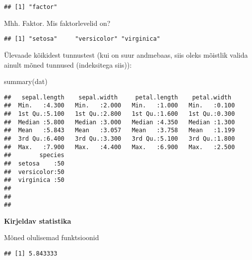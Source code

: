 \documentclass[
]{book}
\newenvironment{Shaded}{\begin{snugshade}}{\end{snugshade}}
\newcommand{\CommentTok}[1]{\textcolor[rgb]{0.56,0.35,0.01}{\textit{#1}}}
\newcommand{\FunctionTok}[1]{\textcolor[rgb]{0.00,0.00,0.00}{#1}}
\newcommand{\NormalTok}[1]{#1}
\newcommand{\SpecialCharTok}[1]{\textcolor[rgb]{0.00,0.00,0.00}{#1}}
\begin{document}
\begin{verbatim}
## [1] "factor"
\end{verbatim}

Mhh. Faktor. Mis faktorlevelid on?

\begin{Shaded}
\end{Shaded}

\begin{verbatim}
## [1] "setosa"     "versicolor" "virginica"
\end{verbatim}

Ülevaade kõikidest tunnustest (kui on suur andmebaas, siis oleks mõistlik valida ainult mõned tunnused (indeksitega siis)):

\begin{Shaded}
\begin{Highlighting}[]
\FunctionTok{summary}\NormalTok{(dat)}
\end{Highlighting}
\end{Shaded}

\begin{verbatim}
##   sepal.length    sepal.width     petal.length    petal.width   
##  Min.   :4.300   Min.   :2.000   Min.   :1.000   Min.   :0.100  
##  1st Qu.:5.100   1st Qu.:2.800   1st Qu.:1.600   1st Qu.:0.300  
##  Median :5.800   Median :3.000   Median :4.350   Median :1.300  
##  Mean   :5.843   Mean   :3.057   Mean   :3.758   Mean   :1.199  
##  3rd Qu.:6.400   3rd Qu.:3.300   3rd Qu.:5.100   3rd Qu.:1.800  
##  Max.   :7.900   Max.   :4.400   Max.   :6.900   Max.   :2.500  
##        species  
##  setosa    :50  
##  versicolor:50  
##  virginica :50  
##                 
##                 
## 
\end{verbatim}

\textbf{Kirjeldav statistika}

Mõned olulisemad funktsioonid

\begin{Shaded}
\end{Shaded}

\begin{verbatim}
## [1] 5.843333
\end{verbatim}
\end{document}
